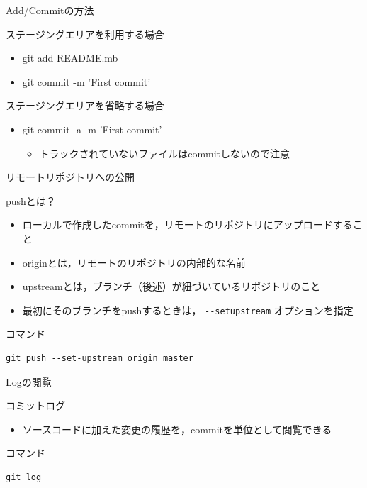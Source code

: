 \documentclass[t, aspectratio=169]{beamer}
\begin{document}
\begin{frame}[label=sec-2-3-4]{Add/Commitの方法}
\begin{block}{ステージングエリアを利用する場合}
\begin{itemize}
\item git add README.mb
\item git commit -m 'First commit'
\end{itemize}
\end{block}
\begin{block}{ステージングエリアを省略する場合}
\begin{itemize}
\item git commit -a -m 'First commit'
\begin{itemize}
\item トラックされていないファイルはcommitしないので注意
\end{itemize}
\end{itemize}
\end{block}
\end{frame}

\begin{frame}[fragile,label=sec-2-3-5]{リモートリポジトリへの公開}
 \begin{block}{pushとは？}
\begin{itemize}
\item ローカルで作成したcommitを，リモートのリポジトリにアップロードすること
\item originとは，リモートのリポジトリの内部的な名前
\item upstreamとは，ブランチ（後述）が紐づいているリポジトリのこと
\item 最初にそのブランチをpushするときは， \texttt{-{}-setupstream} オプションを指定
\end{itemize}
\end{block}
\begin{block}{コマンド}
\begin{verbatim}
git push --set-upstream origin master
\end{verbatim}
\end{block}
\end{frame}

\begin{frame}[fragile,label=sec-2-3-6]{Logの閲覧}
 \begin{block}{コミットログ}
\begin{itemize}
\item ソースコードに加えた変更の履歴を，commitを単位として閲覧できる
\end{itemize}
\end{block}
\begin{block}{コマンド}
\begin{verbatim}
git log
\end{verbatim}
\end{block}
\end{frame}
\end{document}
